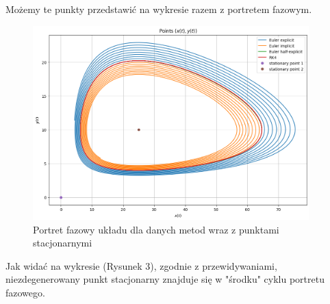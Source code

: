 \documentclass{article}
\begin{document}
Możemy te punkty przedstawić na wykresie razem z portretem fazowym.
\begin{figure}[H]
    \centering
    \includegraphics[width=0.95\textwidth]{3}
    \caption{Portret fazowy układu dla danych metod wraz z punktami stacjonarnymi}
    \label{fig:mesh}
\end{figure}
Jak widać na wykresie (Rysunek 3), zgodnie z przewidywaniami, niezdegenerowany punkt stacjonarny znajduje się w "środku" cyklu portretu fazowego.
\end{document}
